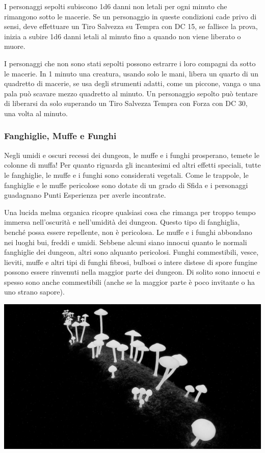 \begin{multicols}{2}
I personaggi sepolti subiscono 1d6 danni non letali per ogni minuto che rimangono sotto le macerie. Se un personaggio in queste condizioni cade privo di sensi, deve effettuare un Tiro Salvezza su Tempra con DC 15, se fallisce la prova, inizia a subire 1d6 danni letali al minuto fino a quando non viene liberato o muore.

I personaggi che non sono stati sepolti possono estrarre i loro compagni da sotto le macerie. In 1 minuto una creatura, usando solo le mani, libera un quarto di un quadretto di macerie, se usa degli strumenti adatti, come un piccone, vanga o una pala può scavare mezzo quadretto al minuto. Un personaggio sepolto può tentare di liberarsi da solo superando un Tiro Salvezza Tempra con Forza con DC 30, una volta al minuto.

\subsubsection{Fanghiglie, Muffe e Funghi}

Negli umidi e oscuri recessi dei dungeon, le muffe e i funghi prosperano, temete le colonne di muffa! Per quanto riguarda gli incantesimi ed altri effetti speciali, tutte le fanghiglie, le muffe e i funghi sono considerati vegetali. Come le trappole, le fanghiglie e le muffe pericolose sono dotate di un grado di Sfida e i personaggi guadagnano Punti Esperienza per averle incontrate.

Una lucida melma organica ricopre qualsiasi cosa che rimanga per troppo tempo immersa nell'oscurità e nell'umidità dei dungeon. Questo tipo di fanghiglia, benché possa essere repellente, non è pericolosa. Le muffe e i funghi abbondano nei luoghi bui, freddi e umidi. Sebbene alcuni siano innocui quanto le normali fanghiglie dei dungeon, altri sono alquanto pericolosi. Funghi commestibili, vesce, lieviti, muffe e altri tipi di funghi fibrosi, bulbosi o intere distese di spore fungine possono essere rinvenuti nella maggior parte dei dungeon. Di solito sono innocui e spesso sono anche commestibili (anche se la maggior parte è poco invitante o ha uno strano sapore).

\begin{center}
	\includegraphics[width=0.95\linewidth]{immagini/funghi.png}


\end{center}
\end{multicols}
